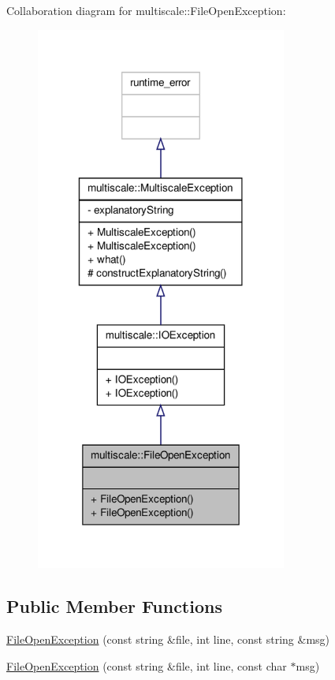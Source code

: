 Collaboration diagram for multiscale\-:\-:File\-Open\-Exception\-:
\nopagebreak
\begin{figure}[H]
\begin{center}
\leavevmode
\includegraphics[width=234pt]{classmultiscale_1_1FileOpenException__coll__graph}
\end{center}
\end{figure}
\subsection*{Public Member Functions}
\begin{DoxyCompactItemize}
\item 
\hyperlink{classmultiscale_1_1FileOpenException_ae574327fb5ac6e396d8c37263f8a2815}{File\-Open\-Exception} (const string \&file, int line, const string \&msg)
\item 
\hyperlink{classmultiscale_1_1FileOpenException_adddaf8af54fd3bdeb5f63d5a6736fd45}{File\-Open\-Exception} (const string \&file, int line, const char $\ast$msg)
\end{DoxyCompactItemize}
